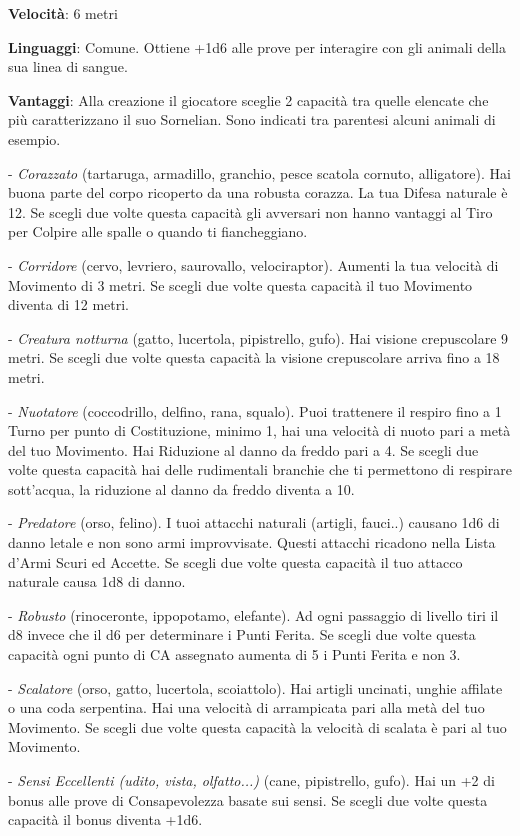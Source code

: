 \begin{multicols}{2}
\textbf{Velocità}: 6 metri

\textbf{Linguaggi}: Comune. Ottiene +1d6 alle prove per interagire con gli animali della sua linea di sangue.

\textbf{Vantaggi}: Alla creazione il giocatore sceglie 2 capacità tra quelle elencate che più caratterizzano il suo Sornelian. Sono indicati tra parentesi alcuni animali di esempio.

- \emph{Corazzato} (tartaruga, armadillo, granchio, pesce scatola cornuto, alligatore). Hai buona parte del corpo ricoperto da una robusta corazza. La tua Difesa naturale è 12. Se scegli due volte questa capacità gli avversari non hanno vantaggi al Tiro per Colpire alle spalle o quando ti fiancheggiano.

- \emph{Corridore} (cervo, levriero, saurovallo, velociraptor). Aumenti la tua velocità di Movimento di 3 metri. Se scegli due volte questa capacità il tuo Movimento diventa di 12 metri.

- \emph{Creatura notturna} (gatto, lucertola, pipistrello, gufo). Hai visione crepuscolare 9 metri. Se scegli due volte questa capacità la visione crepuscolare arriva fino a 18 metri.

- \emph{Nuotatore} (coccodrillo, delfino, rana, squalo). Puoi trattenere il respiro fino a 1 Turno per punto di Costituzione, minimo 1, hai una velocità di nuoto pari a metà del tuo Movimento. Hai Riduzione al danno da freddo pari a 4. Se scegli due volte questa capacità hai delle rudimentali branchie che ti permettono di respirare sott'acqua, la riduzione al danno da freddo diventa a 10.

- \emph{Predatore} (orso, felino). I tuoi attacchi naturali (artigli, fauci..) causano 1d6 di danno letale e non sono armi improvvisate. Questi attacchi ricadono nella Lista d'Armi Scuri ed Accette. Se scegli due volte questa capacità il tuo attacco naturale causa 1d8 di danno.

- \emph{Robusto} (rinoceronte, ippopotamo, elefante). Ad ogni passaggio di livello tiri il d8 invece che il d6 per determinare i Punti Ferita. Se scegli due volte questa capacità ogni punto di CA assegnato aumenta di 5 i Punti Ferita e non 3.

- \emph{Scalatore} (orso, gatto, lucertola, scoiattolo). Hai artigli uncinati, unghie affilate o una coda serpentina. Hai una velocità di arrampicata pari alla metà del tuo Movimento. Se scegli due volte questa capacità la velocità di scalata è pari al tuo Movimento.

- \emph{Sensi Eccellenti (udito, vista, olfatto...)} (cane, pipistrello, gufo). Hai un +2 di bonus alle prove di Consapevolezza basate sui sensi. Se scegli due volte questa capacità il bonus diventa +1d6.


\end{multicols}
